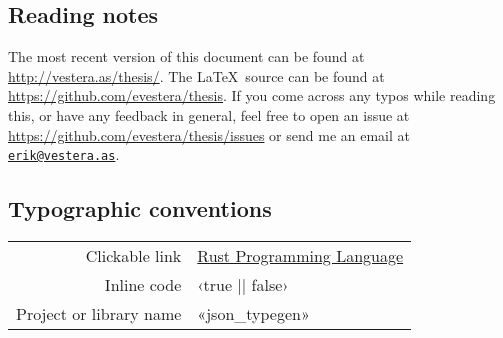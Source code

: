 
\vspace*{2cm}

\begin{center}

\section*{\hfil Reading notes \hfil}

The most recent version of this document can be found at \url{http://vestera.as/thesis/}. The \LaTeX\ source can be found at \url{https://github.com/evestera/thesis}. If you come across any typos while reading this, or have any feedback in general, feel free to open an issue at \url{https://github.com/evestera/thesis/issues} or send me an email at \href{mailto:erik@vestera.as}{\nolinkurl{erik@vestera.as}}.

\subsection*{\hfil Typographic conventions \hfil}

\begin{tabular}{ r l }
Clickable link & \href{https://www.rust-lang.org/}{Rust Programming Language} \\
Inline code & ‹true || false› \\
Project or library name & «json_typegen» \\
\end{tabular}

\end{center}
